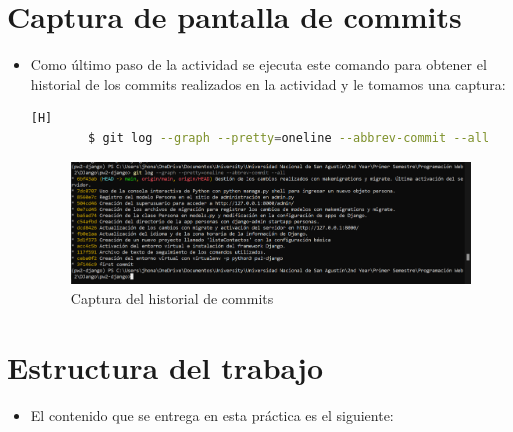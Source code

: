 \documentclass{article}
\begin{document}
    \section{Captura de pantalla de commits}
        \begin{itemize}
            \item Como último paso de la actividad se ejecuta este comando para obtener el historial de los commits realizados en la actividad y le tomamos una captura:
        \begin{lstlisting}[language=bash,caption={Historial de commits}][H]
        $ git log --graph --pretty=oneline --abbrev-commit --all
        \end{lstlisting}
        \begin{figure}[H]
            \centering
            \includegraphics[width=1\linewidth]{img/Captura.png}
            \caption{Captura del historial de commits}
            \label{fig:enter-label}
        \end{figure}
        \end{itemize}
    \clearpage
    
        
    \section{Estructura del trabajo}
        \begin{itemize}	
            \item El contenido que se entrega en esta práctica es el siguiente:
        \end{itemize}
\end{document}
